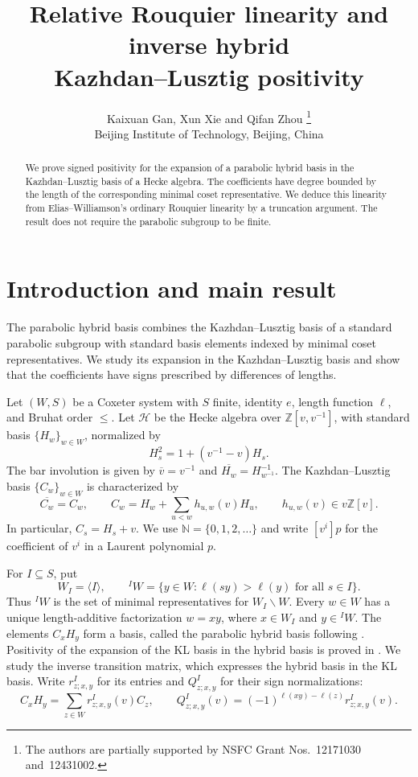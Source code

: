 \documentclass[11pt,a4paper]{article}
\title{Relative Rouquier linearity and inverse hybrid\\Kazhdan--Lusztig positivity}
\author{Kaixuan Gan, Xun Xie and Qifan Zhou%
\thanks{The authors are partially supported by NSFC Grant Nos.~12171030 and~12431002.}\\[0.5ex]
\normalsize Beijing Institute of Technology, Beijing, China}
\numberwithin{equation}{section}
\theoremstyle{remark}
\newcommand{\Z}{\mathbb Z}
\newcommand{\N}{\mathbb N}
\newcommand{\HH}{\mathcal H}
\begin{document}
\maketitle
\vspace{-1.8em}
\begin{abstract}
We prove signed positivity for the expansion of a parabolic hybrid
basis in the Kazhdan--Lusztig basis of a Hecke algebra.
The coefficients have degree bounded by the length of
the corresponding minimal coset representative. 
We deduce this linearity from Elias--Williamson's ordinary Rouquier
linearity by a truncation argument. The result does not require the parabolic subgroup
to be finite.
\end{abstract}

\section{Introduction and main result}

The parabolic hybrid basis combines the Kazhdan--Lusztig basis of a
standard parabolic subgroup with standard basis elements indexed by
minimal coset representatives. We study its expansion in the
Kazhdan--Lusztig basis and show that the coefficients have signs
prescribed by differences of lengths.

Let $(W,S)$ be a Coxeter system with $S$ finite, identity $e$, length function
$\ell$, and Bruhat order $\le$. Let $\HH$ be the Hecke algebra over
$\Z[v,v^{-1}]$, with standard basis $\{H_w\}_{w\in W}$, normalized by
\[
 H_s^2=1+(v^{-1}-v)H_s.
\]
The bar involution is given by $\overline v=v^{-1}$ and
$\overline{H_w}=H_{w^{-1}}^{-1}$. The Kazhdan--Lusztig basis
$\{C_w\}_{w\in W}$ is characterized by
\[
 \overline{C_w}=C_w,\qquad
 C_w=H_w+\sum_{u<w}h_{u,w}(v)H_u,
 \qquad h_{u,w}(v)\in v\Z[v].
\]
In particular, $C_s=H_s+v$. We use $\N=\{0,1,2,\ldots\}$ and write
$[v^i]p$ for the coefficient of $v^i$ in a Laurent polynomial $p$.

For $I\subseteq S$, put
\[
 W_I=\langle I\rangle,\qquad
 {}^I W=\{y\in W:\ell(sy)>\ell(y)\text{ for all }s\in I\}.
\]
Thus ${}^I W$ is the set of minimal representatives for
$W_I\backslash W$. Every $w\in W$ has a unique length-additive factorization $w=xy$, where
$x\in W_I$ and $y\in{}^I W$. The elements $C_xH_y$ form a basis,
called the parabolic hybrid basis following \cite[\S3.1]{GH}.
Positivity of the expansion of the KL basis in the hybrid
basis is proved in \cite[Corollary~1.2]{XZ}.
We study the inverse transition matrix, which expresses the hybrid
basis in the KL basis. Write
$r^I_{z;x,y}$ for its entries and $Q^I_{z;x,y}$ for their sign
normalizations:
\begin{equation}\label{eq:inverse}
 C_xH_y=\sum_{z\in W}r^I_{z;x,y}(v)C_z,
 \qquad
 Q^I_{z;x,y}(v)=(-1)^{\ell(xy)-\ell(z)}r^I_{z;x,y}(v).
\end{equation}
\end{document}

